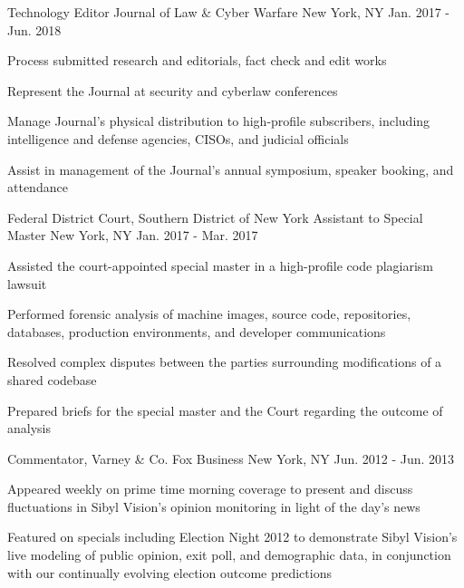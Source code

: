 \begin{cventries}
  \cventry
    {Technology Editor} %
    {Journal of Law \& Cyber Warfare} %
    {New York, NY} %
    {Jan. 2017 - Jun. 2018} %
    {
      \begin{cvitems} %
		\item {Process submitted research and editorials, fact check and edit works}
		\item {Represent the Journal at security and cyberlaw conferences}
		\item {Manage Journal's physical distribution to high-profile subscribers, including intelligence and defense agencies, CISOs, and judicial officials}
		\item {Assist in management of the Journal's annual symposium, speaker booking, and attendance}
      \end{cvitems}
    }

  \cventry
    {Federal District Court, Southern District of New York} %
    {Assistant to Special Master} %
    {New York, NY} %
    {Jan. 2017 - Mar. 2017} %
    {
      \begin{cvitems} %
		\item {Assisted the court-appointed special master in a high-profile code plagiarism lawsuit}
      	\item {Performed forensic analysis of machine images, source code, repositories, databases, production environments, and developer communications}
      	\item {Resolved complex disputes between the parties surrounding modifications of a shared codebase}
      	\item {Prepared briefs for the special master and the Court regarding the outcome of analysis}
      \end{cvitems}
    }

  \cventry
    {Commentator, Varney \& Co.} %
    {Fox Business} %
    {New York, NY} %
    {Jun. 2012 - Jun. 2013} %
    {
      \begin{cvitems} %
      	\item {Appeared weekly on prime time morning coverage to present and discuss fluctuations in Sibyl Vision's opinion monitoring in light of the day's news}
      	\item {Featured on specials including Election Night 2012 to demonstrate Sibyl Vision's live modeling of public opinion, exit poll, and demographic data, in conjunction with our continually evolving election outcome predictions}
      \end{cvitems}
    }


\end{cventries}
